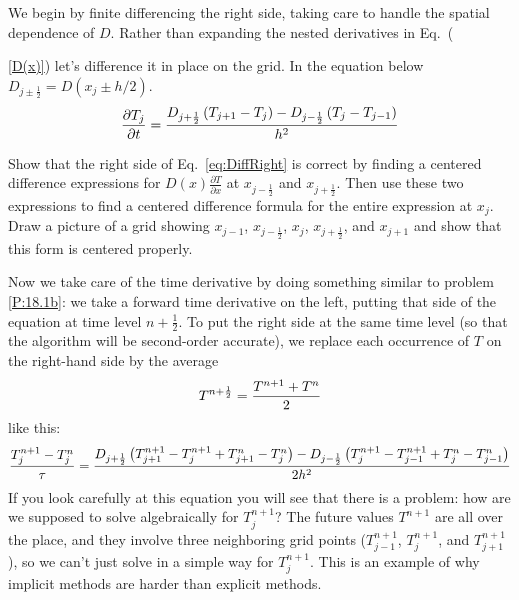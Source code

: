 We begin by finite differencing the right side, taking care to
handle the spatial dependence of $D$. Rather than expanding the
nested derivatives in Eq.~({\ref{D(x)}) let's difference it in place
on the grid. In the equation below $D_{j\pm \frac{1}{2}} = D(x_j \pm h/2)$.
\begin{equation} \label{eq:DiffRight}
    {\partial T_j \over \partial t} =
    \frac{ D_{j+\frac{1}{2}} \left( T_{j+1}-T_j \right)
    -  D_{j-\frac{1}{2}} \left( T_j-T_{j-1} \right) }
    {h^2}
\end{equation}
\begin{enumerate}
\probtwo \label{P:8.2} Show that the right side of
    Eq.~\eqref{eq:DiffRight} is correct by finding a centered
    difference expressions for $D(x) \frac{\partial
    T}{\partial x}$ at $x_{j-\frac{1}{2}}$ and
    $x_{j+\frac{1}{2}}$.  Then use these two expressions to
    find a centered difference formula for the entire
    expression at $x_j$.  Draw a picture of a grid showing
    $x_{j-1}$, $x_{j-\frac{1}{2}}$, $x_j$,
    $x_{j+\frac{1}{2}}$, and $x_{j+1}$ and show that this
    form is centered properly.
\end{enumerate}


 Now we take care of the time derivative by doing something
similar to problem \ref{P:18.1b}: we take a forward time derivative on
the left, putting that side of the equation at time level
$n+\frac{1}{2}$. To put the right side at the same time level
(so that the algorithm will be second-order accurate), we
replace each occurrence of $T$ on the right-hand side by the
average
\begin{equation}
    T^{n+\frac{1}{2}} = {T^{n+1} + T^n \over 2}
\end{equation}
like this:
\begin{equation}
    {T_j^{n+1}-T_j^n \over \tau} = \frac{ D_{j+\frac{1}{2}}
    \left( T_{j+1}^{n+1} - T_j^{n+1}+  T_{j+1}^n-T_j^n \right) -
    D_{j-\frac{1}{2}} \left( T_{j}^{n+1} - T_{j-1}^{n+1}+
    T_j^n-T_{j-1}^n \right) } {2 h^2}
\end{equation}
 If you look carefully at this equation you will see that there is a
problem: how are we supposed to solve algebraically for $T_j^{n+1}$?
The future values $T^{n+1}$ are all over the place, and they involve
three neighboring grid points ($T^{n+1}_{j-1}$, $T^{n+1}_{j}$, and
$T^{n+1}_{j+1}$), so we can't just solve in a simple way for
$T^{n+1}_j$. This is an example of why implicit methods are harder
than explicit methods.


}
